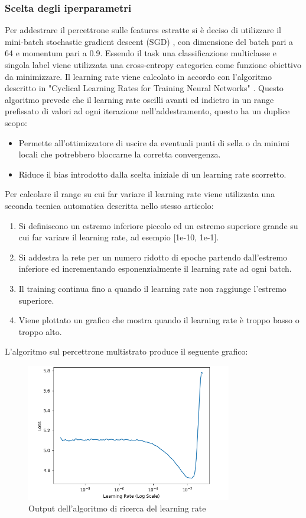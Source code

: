 \subsubsection{Scelta degli iperparametri}
Per addestrare il percettrone sulle features estratte si è deciso di utilizzare il mini-batch stochastic gradient descent (SGD) \cite{kiefer1952}, con dimensione del batch pari a 64 e momentum pari a 0.9.
Essendo il task una classificazione multiclasse e singola label viene utilizzata una cross-entropy categorica come funzione obiettivo da minimizzare.
Il learning rate viene calcolato in accordo con l'algoritmo descritto in "Cyclical Learning Rates for Training Neural Networks" \cite{smith2015cyclical}.
Questo algoritmo prevede che il learning rate oscilli avanti ed indietro in un range prefissato di valori ad ogni iterazione nell'addestramento, questo ha un duplice scopo:
\begin{itemize}
\item Permette all'ottimizzatore di uscire da eventuali punti di sella o da minimi locali che potrebbero bloccarne la corretta convergenza.
\item Riduce il bias introdotto dalla scelta iniziale di un learning rate scorretto.
\end{itemize}
Per calcolare il range su cui far variare il learning rate viene utilizzata una seconda tecnica automatica descritta nello stesso articolo:
\begin{enumerate}
\item Si definiscono un estremo inferiore piccolo ed un estremo superiore grande su cui far variare il learning rate, ad esempio [1e-10, 1e-1].
\item Si addestra la rete per un numero ridotto di epoche partendo dall'estremo inferiore ed incrementando esponenzialmente il learning rate ad ogni batch.
\item Il training continua fino a quando il learning rate non raggiunge l'estremo superiore.
\item Viene plottato un grafico che mostra quando il learning rate è troppo basso o troppo alto.
\end{enumerate} 
L'algoritmo sul percettrone multistrato produce il seguente grafico:
\begin{figure}[ht]
\centering
\includegraphics[width=0.8\textwidth]{images/baseline/lrfind_plot.png} 
\caption{Output dell'algoritmo di ricerca del learning rate}
\label{fig_baseline_finder}
\vspace{-15mm}
\end{figure}
